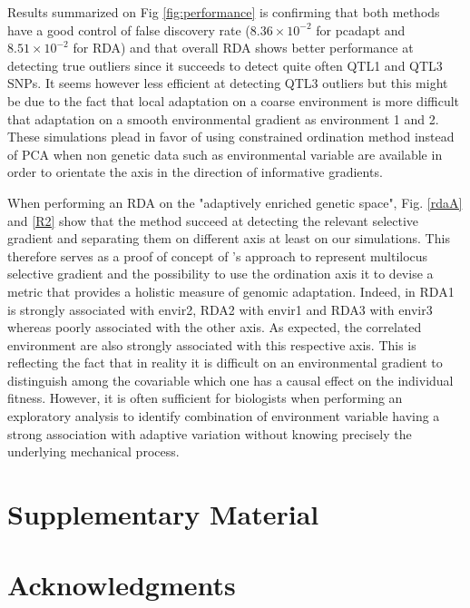 \documentclass[nogrid]{MBE}%
\begin{document}
Results summarized on Fig \ref{fig:performance} is confirming that both methods have a good control of false discovery rate ($8.36 \times 10^{-2}$ for pcadapt and $8.51 \times 10^{-2}$ for RDA) and that overall RDA shows better performance at detecting true outliers since it succeeds to detect quite often QTL1 and QTL3 SNPs. It seems however less efficient at detecting QTL3 outliers but this might be due to the fact that local adaptation on a coarse environment is more difficult  that adaptation on a smooth environmental gradient as environment 1 and 2. These simulations plead in favor of using constrained ordination method instead of PCA when non genetic data such as environmental variable are available in order to orientate the axis in the direction of informative gradients.

When performing an RDA on the "adaptively enriched genetic space", Fig. \ref{rdaA} and \ref{R2} show that the method succeed at detecting the relevant selective gradient and separating them on different axis at least on our simulations. This therefore serves as a proof of concept of \citet{Steane2014a}'s approach to represent multilocus selective gradient and the possibility to use the ordination axis it to devise a metric that provides a holistic measure of genomic adaptation. Indeed, in RDA1 is strongly associated with envir2, RDA2 with envir1 and RDA3 with envir3 whereas poorly associated with the other axis. As expected, the correlated environment are also strongly associated with this respective axis. This is reflecting the fact that in reality it is difficult on an environmental gradient to distinguish  among the covariable which one has a causal effect on the individual fitness. However, it is often sufficient for biologists when performing an exploratory analysis to identify combination of environment variable having a strong association with adaptive variation without knowing precisely the underlying mechanical process.


\section{Supplementary Material}


\section{Acknowledgments}



\end{document}

